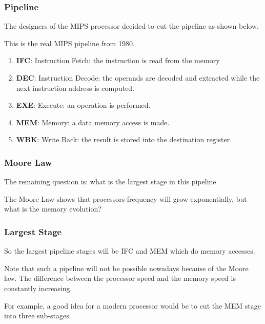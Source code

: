 \begin{frame}
  \frametitle{Pipeline}

  The designers of the MIPS processor decided to cut the pipeline as
  shown below.

  \-

  This is the real MIPS pipeline from 1980.

  \begin{enumerate}
    \item
      \textbf{IFC}: Instruction Fetch: the instruction is read from the
      memory
    \item
      \textbf{DEC}: Instruction Decode: the operands are decoded and
      extracted while the next instruction address is computed.
    \item
      \textbf{EXE}: Execute: an operation is performed.
    \item
      \textbf{MEM}: Memory: a data memory access is made.
    \item
      \textbf{WBK}: Write Back: the result is stored into the destination
      register.
  \end{enumerate}
\end{frame}


\begin{frame}
  \frametitle{Moore Law}

  The remaining question is: what is the largest stage in this pipeline.

  \-

  The Moore Law shows that processors frequency will grow exponentially,
  but what is the memory evolution?

  \begin{center}
  \end{center}
\end{frame}


\begin{frame}
  \frametitle{Largest Stage}

  So the largest pipeline stages will be IFC and MEM which do memory
  accesses.

  \-

  Note that such a pipeline will not be possible nowadays because of the
  Moore law. The difference between the processor speed and the memory speed
  is constantly increasing.

  \-

  For example, a good idea for a modern processor would be to cut the
  MEM stage into three sub-stages.
\end{frame}

